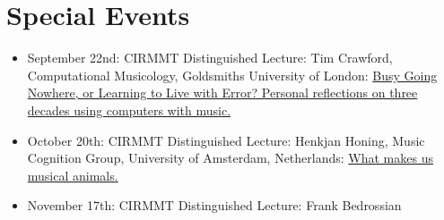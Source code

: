\documentclass[11pt]{amsart}
\begin{document}
\section{Special Events}
\begin{itemize}

\item September 22nd: CIRMMT Distinguished Lecture: Tim Crawford, Computational Musicology, Goldsmiths University of London: \href{http://www.cirmmt.org/activities/distinguished-lectures/Tim_Crawford}{Busy Going Nowhere, or Learning to Live with Error? Personal reflections on three decades using computers with music.}
\item October 20th: CIRMMT Distinguished Lecture: Henkjan Honing, Music Cognition Group, University of Amsterdam, Netherlands: \href{http://www.cirmmt.org/activities/distinguished-lectures/copy_of_vorlander}{What makes us musical animals.}
\item November 17th: CIRMMT Distinguished Lecture: Frank Bedrossian

\end{itemize}
\end{document}
